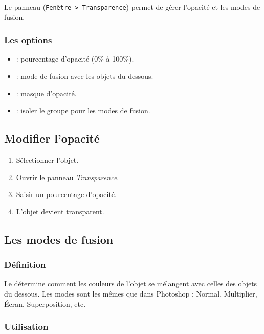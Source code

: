 Le panneau  (\texttt{Fenêtre > Transparence}) permet de gérer l'opacité et les modes de fusion.

\subsubsection{Les options}

\begin{itemize}
    \item {} : pourcentage d'opacité (0\% à 100\%).
    \item {} : mode de fusion avec les objets du dessous.
    \item {} : masque d'opacité.
    \item {} : isoler le groupe pour les modes de fusion.
\end{itemize}

\subsection{Modifier l'opacité}

\begin{enumerate}
    \item Sélectionner l'objet.
    \item Ouvrir le panneau \emph{Transparence}.
    \item Saisir un pourcentage d'opacité.
    \item L'objet devient transparent.
\end{enumerate}

\subsection{Les modes de fusion}

\subsubsection{Définition}

Le  détermine comment les couleurs de l'objet se mélangent avec celles des objets du dessous. Les modes sont les mêmes que dans Photoshop : Normal, Multiplier, Écran, Superposition, etc.

\subsubsection{Utilisation}

